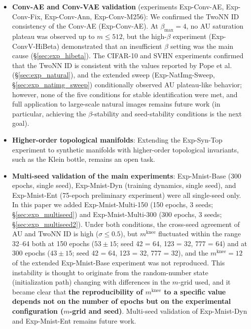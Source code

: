 \documentclass[make,article,submit,pdftex,moreauthors]{Definitions/mdpi}
\newcommand{\mknee}{m^{\mathrm{knee}}}
\begin{document}
\begin{itemize}
  \item \textbf{Conv-AE and Conv-VAE validation} (experiments Exp-Conv-AE, Exp-Conv-Fix,
        Exp-Conv-Ann, Exp-Conv-M256):
        We confirmed the TwoNN ID consistency of the Conv-AE (Exp-Conv-AE).
        At $\beta_{\max}=4$, no AU saturation plateau was observed up to $m \leq 512$,
        but the high-$\beta$ experiment (Exp-ConvV-HiBeta) demonstrated that an
        insufficient $\beta$ setting was the main cause (\S\ref{sec:exp_hibeta}).
        The CIFAR-10 and SVHN experiments confirmed that the TwoNN ID is consistent with
        the values reported by Pope et al.~\cite{pope2021intrinsic}
        (\S\ref{sec:exp_natural}), and the extended sweep (Exp-NatImg-Sweep,
        \S\ref{sec:exp_natimg_sweep}) conditionally observed AU plateau-like behavior;
        however, none of the five conditions for stable identification were met, and
        full application to large-scale natural images remains future work (in
        particular, achieving the $\beta$-stability and seed-stability conditions is
        the next goal).
  \item \textbf{Higher-order topological manifolds}: Extending the Exp-Syn-Top
        experiment to synthetic manifolds with higher-order topological invariants,
        such as the Klein bottle, remains an open task.
  \item \textbf{Multi-seed validation of the main experiments}:
        Exp-Mnist-Base (300 epochs, single seed), Exp-Mnist-Dyn (training dynamics,
        single seed), and Exp-Mnist-Ent (75-epoch preliminary experiment) were all
        single-seed only.
        In this paper we added Exp-Mnist-Multi-150 (150 epochs, 3 seeds; \S\ref{sec:exp_multiseed})
        and Exp-Mnist-Multi-300 (300 epochs, 3 seeds; \S\ref{sec:exp_multiseed2}).
        Under both conditions, the cross-seed agreement of AU and TwoNN ID is high
        ($\sigma \leq 0.5$), but $\mknee$ fluctuated within the range 32--64 both at
        150 epochs ($53 \pm 15$; seed 42 = 64, 123 = 32, 777 = 64) and at 300 epochs
        ($43 \pm 15$; seed 42 = 64, 123 = 32, 777 = 32), and the $\mknee = 12$ of the
        extended Exp-Mnist-Base experiment was not reproduced.
        This instability is thought to originate from the random-number state
        (initialization path) changing with differences in the $m$-grid used, and it
        became clear that \textbf{the reproducibility of $\mknee$ to a specific value
        depends not on the number of epochs but on the experimental configuration
        ($m$-grid and seed)}.
        Multi-seed validation of Exp-Mnist-Dyn and Exp-Mnist-Ent remains future work.
\end{itemize}
\end{document}
